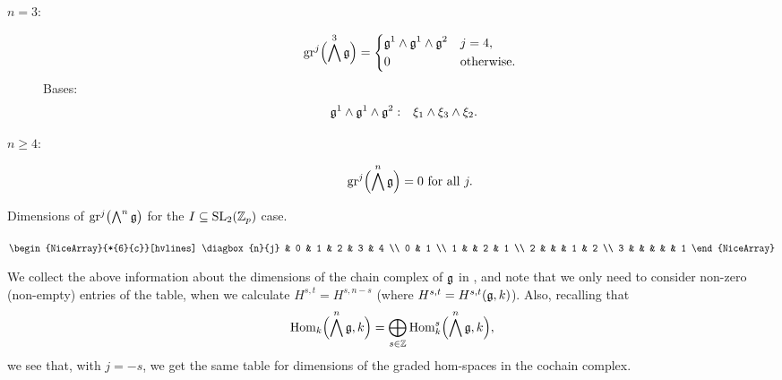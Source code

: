 \begin{description}
  \item[$n=3:$]
        \begin{equation*}
          \operatorname{gr}^{j}\Bigl( \bigwedge^{3}\mathfrak{g} \Bigr) =
          \begin{dcases}
            \mathfrak{g}^{1} \wedge \mathfrak{g}^{1} \wedge \mathfrak{g}^{2} & j=4, \\ 0                                                & \text{otherwise.}
          \end{dcases}
        \end{equation*}
        Bases:
        \begin{align*}
          \mathfrak{g}^{1} \wedge \mathfrak{g}^{1} \wedge \mathfrak{g}^{2}: \quad & \xi_{1} \wedge \xi_{3} \wedge \xi_{2}.
        \end{align*}

   \item[$n\geq4:$]
        \begin{equation*}
          \operatorname{gr}^{j}\Bigl( \bigwedge^{n}\mathfrak{g} \Bigr) = 0 \text{ for all } j.
        \end{equation*}
\end{description}

\begin{table}[ht]
  \centering
  \caption[Graded complex dimensions for the $I \subseteq \SL_{2}(\Z_{p})$ case.]{Dimensions of $\operatorname{gr}^{j}\bigl( \bigwedge^{n} \mathfrak{g} \bigr)$ for the $I \subseteq \SL_{2}(\Z_{p})$ case.}
  \label{tab:graded-dims-SL2}
  $\begin{NiceArray}{*{6}{c}}[hvlines]
    \diagbox{n}{j} & 0 & 1 & 2 & 3 & 4 \\
    0 & 1 \\
    1 & & 2 & 1 \\
    2 & & & 1 & 2 \\
    3 & & & & & 1
  \end{NiceArray}$
\end{table}

We collect the above information about the dimensions of the chain complex of $\mathfrak{g}$ in , and note that we only need to consider non-zero (non-empty) entries of the table, when we calculate  $H^{s,t} = H^{s,n-s}$ (where $H^{s,t} = H^{s,t}(\mathfrak{g},k)$). Also, recalling that
\begin{equation*}
  \operatorname{Hom}_{k}\Bigl( \bigwedge^{n}\mathfrak{g}, k \Bigr) = \bigoplus_{s \in \mathbb{Z}} \operatorname{Hom}_{k}^{s}\Bigl( \bigwedge^{n}\mathfrak{g}, k \Bigr),
\end{equation*}
we see that, with $j=-s$, we get the same table for dimensions of the graded hom-spaces in the cochain complex.

